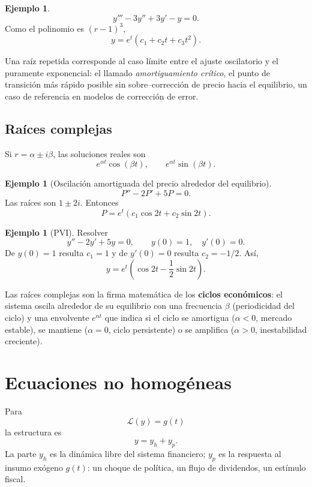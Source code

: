 \documentclass[11pt]{article}
\theoremstyle{definition}
\newtheorem{ejemplo}[teorema]{Ejemplo}
\begin{document}
\begin{ejemplo}
\[
y'''-3y''+3y'-y=0.
\]
Como el polinomio es $(r-1)^3$,
\[
\boxed{y=e^t(c_1+c_2t+c_3t^2)}.
\]
\end{ejemplo}

\begin{finanzas}
Una raíz repetida corresponde al caso límite entre el ajuste oscilatorio y el
puramente exponencial: el llamado \emph{amortiguamiento crítico}, el punto de
transición más rápido posible sin sobre--corrección de precio hacia el equilibrio, un
caso de referencia en modelos de corrección de error.
\end{finanzas}

\subsection{Raíces complejas}
Si $r=\alpha\pm i\beta$, las soluciones reales son
\[
e^{\alpha t}\cos(\beta t),\qquad
e^{\alpha t}\sin(\beta t).
\]

\begin{ejemplo}[Oscilación amortiguada del precio alrededor del equilibrio]
\[
P''-2P'+5P=0.
\]
Las raíces son $1\pm2i$. Entonces
\[
\boxed{P=e^t(c_1\cos2t+c_2\sin2t)}.
\]
\end{ejemplo}

\begin{ejemplo}[PVI]
Resolver
\[
y''-2y'+5y=0,\qquad y(0)=1,\quad y'(0)=0.
\]
De $y(0)=1$ resulta $c_1=1$ y de $y'(0)=0$ resulta $c_2=-1/2$. Así,
\[
\boxed{y=e^t\left(\cos2t-\frac12\sin2t\right)}.
\]
\end{ejemplo}

\begin{finanzas}
Las raíces complejas son la firma matemática de los \textbf{ciclos económicos}: el
sistema oscila alrededor de su equilibrio con una frecuencia $\beta$ (periodicidad del
ciclo) y una envolvente $e^{\alpha t}$ que indica si el ciclo se amortigua ($\alpha<0$,
mercado estable), se mantiene ($\alpha=0$, ciclo persistente) o se amplifica
($\alpha>0$, inestabilidad creciente).
\end{finanzas}

\section{Ecuaciones no homogéneas}
Para
\[
\mathcal L(y)=g(t)
\]
la estructura es
\[
\boxed{y=y_h+y_p}.
\]
La parte $y_h$ es la dinámica libre del sistema financiero; $y_p$ es la respuesta al
insumo exógeno $g(t)$: un choque de política, un flujo de dividendos, un estímulo
fiscal.
\end{document}

